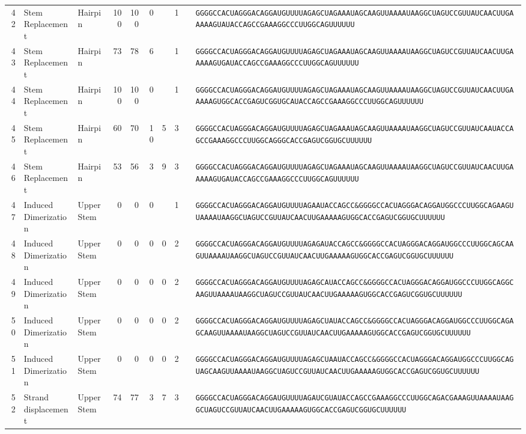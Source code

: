 \begin{tabular}{rllrrrrrcl}
 42 &
 Stem Replacement &
 Hairpin &
 100 &
 100 &
 0 &
  &
 1 &
  &
 \verb|GGGGCCACUAGGGACAGGAUGUUUUAGAGCUAGAAAUAGCAAGUUAAAAUAAGGCUAGUCCGUUAUCAACUUGAAAAAGUAUACCAGCCGAAAGGCCCUUGGCAGUUUUUU| \\
 43 &
 Stem Replacement &
 Hairpin &
 73 &
 78 &
 6 &
  &
 1 &
  &
 \verb|GGGGCCACUAGGGACAGGAUGUUUUAGAGCUAGAAAUAGCAAGUUAAAAUAAGGCUAGUCCGUUAUCAACUUGAAAAAGUGAUACCAGCCGAAAGGCCCUUGGCAGUUUUUU| \\
 44 &
 Stem Replacement &
 Hairpin &
 100 &
 100 &
 0 &
  &
 1 &
  &
 \verb|GGGGCCACUAGGGACAGGAUGUUUUAGAGCUAGAAAUAGCAAGUUAAAAUAAGGCUAGUCCGUUAUCAACUUGAAAAAGUGGCACCGAGUCGGUGCAUACCAGCCGAAAGGCCCUUGGCAGUUUUUU| \\
 45 &
 Stem Replacement &
 Hairpin &
 60 &
 70 &
 10 &
 5 &
 3 &
  &
 \verb|GGGGCCACUAGGGACAGGAUGUUUUAGAGCUAGAAAUAGCAAGUUAAAAUAAGGCUAGUCCGUUAUCAAUACCAGCCGAAAGGCCCUUGGCAGGGCACCGAGUCGGUGCUUUUUU| \\
 46 &
 Stem Replacement &
 Hairpin &
 53 &
 56 &
 3 &
 9 &
 3 &
  &
 \verb|GGGGCCACUAGGGACAGGAUGUUUUAGAGCUAGAAAUAGCAAGUUAAAAUAAGGCUAGUCCGUUAUCAACUUGAAAAAGUGAUACCAGCCGAAAGGCCCUUGGCAGUUUUUU| \\
 47 &
 Induced Dimerization &
 Upper Stem &
 0 &
 0 &
 0 &
  &
 1 &
  &
 \verb|GGGGCCACUAGGGACAGGAUGUUUUAGAAUACCAGCC&GGGGCCACUAGGGACAGGAUGGCCCUUGGCAGAAGUUAAAAUAAGGCUAGUCCGUUAUCAACUUGAAAAAGUGGCACCGAGUCGGUGCUUUUUU| \\
 48 &
 Induced Dimerization &
 Upper Stem &
 0 &
 0 &
 0 &
 0 &
 2 &
  &
 \verb|GGGGCCACUAGGGACAGGAUGUUUUAGAGAUACCAGCC&GGGGCCACUAGGGACAGGAUGGCCCUUGGCAGCAAGUUAAAAUAAGGCUAGUCCGUUAUCAACUUGAAAAAGUGGCACCGAGUCGGUGCUUUUUU| \\
 49 &
 Induced Dimerization &
 Upper Stem &
 0 &
 0 &
 0 &
 0 &
 2 &
  &
 \verb|GGGGCCACUAGGGACAGGAUGUUUUAGAGCAUACCAGCC&GGGGCCACUAGGGACAGGAUGGCCCUUGGCAGGCAAGUUAAAAUAAGGCUAGUCCGUUAUCAACUUGAAAAAGUGGCACCGAGUCGGUGCUUUUUU| \\
 50 &
 Induced Dimerization &
 Upper Stem &
 0 &
 0 &
 0 &
 0 &
 2 &
  &
 \verb|GGGGCCACUAGGGACAGGAUGUUUUAGAGCUAUACCAGCC&GGGGCCACUAGGGACAGGAUGGCCCUUGGCAGAGCAAGUUAAAAUAAGGCUAGUCCGUUAUCAACUUGAAAAAGUGGCACCGAGUCGGUGCUUUUUU| \\
 51 &
 Induced Dimerization &
 Upper Stem &
 0 &
 0 &
 0 &
 0 &
 2 &
  &
 \verb|GGGGCCACUAGGGACAGGAUGUUUUAGAGCUAAUACCAGCC&GGGGCCACUAGGGACAGGAUGGCCCUUGGCAGUAGCAAGUUAAAAUAAGGCUAGUCCGUUAUCAACUUGAAAAAGUGGCACCGAGUCGGUGCUUUUUU| \\
 52 &
 Strand displacement &
 Upper Stem &
 74 &
 77 &
 3 &
 7 &
 3 &
  &
 \verb|GGGGCCACUAGGGACAGGAUGUUUUAGAUCGUAUACCAGCCGAAAGGCCCUUGGCAGACGAAAGUUAAAAUAAGGCUAGUCCGUUAUCAACUUGAAAAAGUGGCACCGAGUCGGUGCUUUUUU| \\

\end{tabular}
